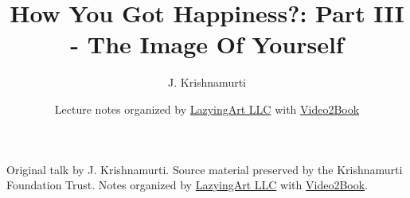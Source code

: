 \documentclass[11pt,oneside]{book}
\begin{document}
\frontmatter
\title{How You Got Happiness?: Part III - The Image Of Yourself}
\author{J. Krishnamurti}
\date{Lecture notes organized by \href{https://lazying.art}{LazyingArt LLC} with \href{https://github.com/lachlanchen/Video2Book}{Video2Book}}
\maketitle
\begin{center}
\small Original talk by J. Krishnamurti. Source material preserved by the Krishnamurti Foundation Trust. Notes organized by \href{https://lazying.art}{LazyingArt LLC} with \href{https://github.com/lachlanchen/Video2Book}{Video2Book}.
\end{center}
\clearpage
\mainmatter

\end{document}
